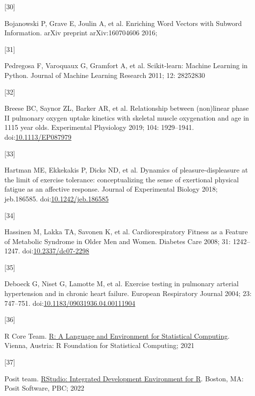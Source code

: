 \documentclass[
  letterpaper,
  DIV=11,
  numbers=noendperiod]{scrartcl}
\newlength{\cslhangindent}
\newlength{\csllabelwidth}
\newenvironment{CSLReferences}[2] %
 {\begin{list}{}{%
  \setlength{\itemindent}{0pt}
  \setlength{\leftmargin}{0pt}
  \setlength{\parsep}{0pt}
  \ifodd #1
   \setlength{\leftmargin}{\cslhangindent}
   \setlength{\itemindent}{-1\cslhangindent}
  \fi
  \setlength{\itemsep}{#2\baselineskip}}}
 {\end{list}}
\newcommand{\CSLLeftMargin}[1]{\parbox[t]{\csllabelwidth}{\strut#1\strut}}
\newcommand{\CSLRightInline}[1]{\parbox[t]{\linewidth - \csllabelwidth}{\strut#1\strut}}
\begin{document}
\begin{CSLReferences}{0}{1}
\CSLLeftMargin{{[}30{]} }%
\CSLRightInline{Bojanowski P, Grave E, Joulin A, et al. Enriching Word
Vectors with Subword Information. arXiv preprint arXiv:160704606 2016;}

\CSLLeftMargin{{[}31{]} }%
\CSLRightInline{Pedregosa F, Varoquaux G, Gramfort A, et al.
Scikit-learn: Machine Learning in Python. Journal of Machine Learning
Research 2011; 12: 28252830}

\CSLLeftMargin{{[}32{]} }%
\CSLRightInline{Breese BC, Saynor ZL, Barker AR, et al. Relationship
between (non)linear phase II pulmonary oxygen uptake kinetics with
skeletal muscle oxygenation and age in 11{\textendash}15 year olds.
Experimental Physiology 2019; 104: 1929--1941.
doi:\href{https://doi.org/10.1113/EP087979}{10.1113/EP087979}}

\CSLLeftMargin{{[}33{]} }%
\CSLRightInline{Hartman ME, Ekkekakis P, Dicks ND, et al. Dynamics of
pleasure-displeasure at the limit of exercise tolerance: conceptualizing
the sense of exertional physical fatigue as an affective response.
Journal of Experimental Biology 2018; jeb.186585.
doi:\href{https://doi.org/10.1242/jeb.186585}{10.1242/jeb.186585}}

\CSLLeftMargin{{[}34{]} }%
\CSLRightInline{Hassinen M, Lakka TA, Savonen K, et al.
Cardiorespiratory Fitness as a Feature of Metabolic Syndrome in Older
Men and Women. Diabetes Care 2008; 31: 1242--1247.
doi:\href{https://doi.org/10.2337/dc07-2298}{10.2337/dc07-2298}}

\CSLLeftMargin{{[}35{]} }%
\CSLRightInline{Deboeck G, Niset G, Lamotte M, et al. Exercise testing
in pulmonary arterial hypertension and in chronic heart failure.
European Respiratory Journal 2004; 23: 747--751.
doi:\href{https://doi.org/10.1183/09031936.04.00111904}{10.1183/09031936.04.00111904}}

\CSLLeftMargin{{[}36{]} }%
\CSLRightInline{R Core Team. \href{https://www.R-project.org/}{R: A
Language and Environment for Statistical Computing}. Vienna, Austria: R
Foundation for Statistical Computing; 2021}

\CSLLeftMargin{{[}37{]} }%
\CSLRightInline{Posit team. \href{http://www.posit.co/}{RStudio:
Integrated Development Environment for R}. Boston, MA: Posit Software,
PBC; 2022}


\end{CSLReferences}
\end{document}
